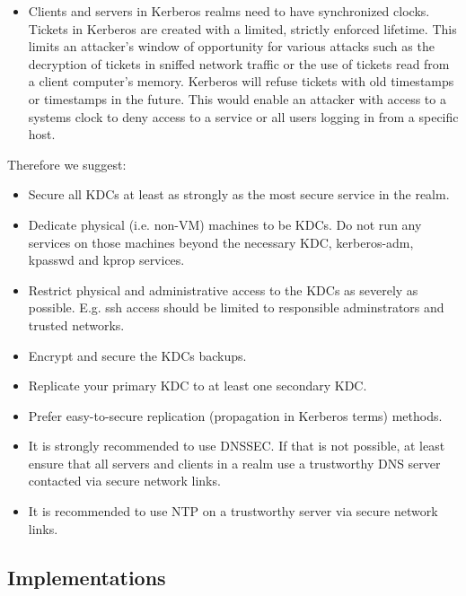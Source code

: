 \begin{itemize}
	\item Clients and servers in Kerberos realms need to have synchronized clocks. Tickets in Kerberos are created with a limited, strictly enforced lifetime. This limits an attacker's window of opportunity for various attacks such as the decryption of tickets in sniffed network traffic or the use of tickets read from a client computer's memory. Kerberos will refuse tickets with old timestamps or timestamps in the future. This would enable an attacker with access to a systems clock to deny access to a service or all users logging in from a specific host.
\end{itemize}

Therefore we suggest:
\begin{itemize}
	\item Secure all KDCs at least as strongly as the most secure service in the realm.
	\item Dedicate physical (i.e. non-VM) machines to be KDCs. Do not run any services on those machines beyond the necessary KDC, kerberos-adm, kpasswd and kprop services. 
	\item Restrict physical and administrative access to the KDCs as severely as possible. E.g. ssh access should be limited to responsible adminstrators and trusted networks. 
	\item Encrypt and secure the KDCs backups.
	\item Replicate your primary KDC to at least one secondary KDC.
	\item Prefer easy-to-secure replication (propagation in Kerberos terms) methods.
	\item It is strongly recommended to use DNSSEC.  If that is not possible, at least ensure that all servers and clients in a realm use a trustworthy DNS server contacted via secure network links.
	\item It is recommended to use NTP on a trustworthy server via secure network links. 
\end{itemize}

\subsection{Implementations}
\label{subsection:kerberos_implementations}


